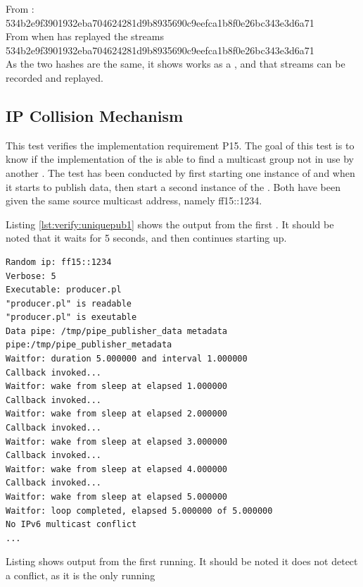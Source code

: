 \noindent{}From \pub{}: \\
534b2e9f3901932eba704624281d9b8935690c9eefca1b8f0e26bc343e3d6a71\\
\noindent{}From \con{} when  has replayed the streams\\
534b2e9f3901932eba704624281d9b8935690c9eefca1b8f0e26bc343e3d6a71\\

\noindent{}As the two hashes are the same, it shows  works as a \hist{}, and that streams can be recorded and replayed.


\subsection{IP Collision Mechanism} 
This test verifies the implementation requirement P15. The goal of this test is to know if the implementation of the \pub{} is able to find a multicast group not in use by another \pub{}.
The test has been conducted by first starting one instance of  and when it starts to publish data, then start a second instance of the . Both  have been given the same source multicast address, namely ff15::1234.

Listing \ref{lst:verify:uniquepub1} shows the output from the first . It should be noted that it waits for 5 seconds, and then continues starting up.

\begin{listing}[H] 
\begin{verbatim}
Random ip: ff15::1234
Verbose: 5
Executable: producer.pl
"producer.pl" is readable
"producer.pl" is exeutable
Data pipe: /tmp/pipe_publisher_data metadata pipe:/tmp/pipe_publisher_metadata
Waitfor: duration 5.000000 and interval 1.000000
Callback invoked...
Waitfor: wake from sleep at elapsed 1.000000
Callback invoked...
Waitfor: wake from sleep at elapsed 2.000000
Callback invoked...
Waitfor: wake from sleep at elapsed 3.000000
Callback invoked...
Waitfor: wake from sleep at elapsed 4.000000
Callback invoked...
Waitfor: wake from sleep at elapsed 5.000000
Waitfor: loop completed, elapsed 5.000000 of 5.000000
No IPv6 multicast conflict
...
\end{verbatim}
\caption{Listing shows output from the first \pub{} running. It should be noted it does not detect a conflict, as it is the only \pub{} running}
\label{lst:verify:uniquepub1}
\end{listing}

